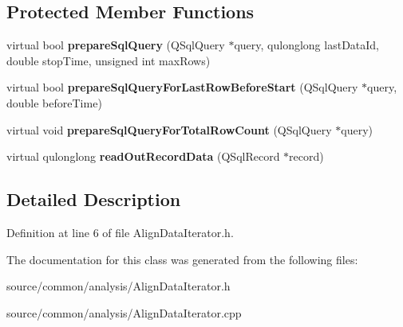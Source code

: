 \subsection*{Protected Member Functions}
\begin{DoxyCompactItemize}
\item 
\hypertarget{class_picto_1_1_align_data_iterator_a4ad9a3e0d5a80d5650f9288b0f2adc70}{virtual bool {\bfseries prepare\-Sql\-Query} (Q\-Sql\-Query $\ast$query, qulonglong last\-Data\-Id, double stop\-Time, unsigned int max\-Rows)}\label{class_picto_1_1_align_data_iterator_a4ad9a3e0d5a80d5650f9288b0f2adc70}

\item 
\hypertarget{class_picto_1_1_align_data_iterator_a06ddcd533d65c1e6988fed53f41682c0}{virtual bool {\bfseries prepare\-Sql\-Query\-For\-Last\-Row\-Before\-Start} (Q\-Sql\-Query $\ast$query, double before\-Time)}\label{class_picto_1_1_align_data_iterator_a06ddcd533d65c1e6988fed53f41682c0}

\item 
\hypertarget{class_picto_1_1_align_data_iterator_a2ecd337526b887d9fa4ac6b5cb6c0729}{virtual void {\bfseries prepare\-Sql\-Query\-For\-Total\-Row\-Count} (Q\-Sql\-Query $\ast$query)}\label{class_picto_1_1_align_data_iterator_a2ecd337526b887d9fa4ac6b5cb6c0729}

\item 
\hypertarget{class_picto_1_1_align_data_iterator_acfd13e86ec0650a28e4bbc467d544249}{virtual qulonglong {\bfseries read\-Out\-Record\-Data} (Q\-Sql\-Record $\ast$record)}\label{class_picto_1_1_align_data_iterator_acfd13e86ec0650a28e4bbc467d544249}

\end{DoxyCompactItemize}


\subsection{Detailed Description}


Definition at line 6 of file Align\-Data\-Iterator.\-h.



The documentation for this class was generated from the following files\-:\begin{DoxyCompactItemize}
\item 
source/common/analysis/Align\-Data\-Iterator.\-h\item 
source/common/analysis/Align\-Data\-Iterator.\-cpp\end{DoxyCompactItemize}
